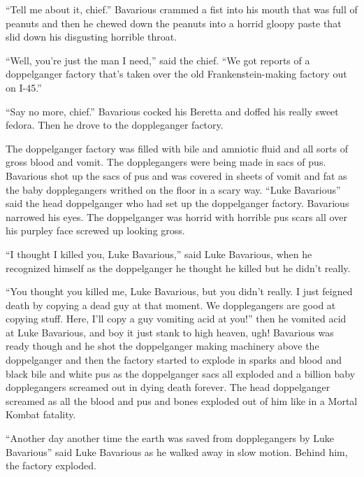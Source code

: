 ``Tell me about it, chief.'' Bavarious crammed a fist
into his mouth that was full of peanuts and then he chewed down the
peanuts into a horrid gloopy paste that slid down his disgusting
horrible throat.

``Well, you're just the man I need,'' said the
chief. ``We got reports of a doppelganger factory that's
taken over the old Frankenstein-making factory out on
I-45.''

``Say no more, chief.'' Bavarious cocked his Beretta and
doffed his really sweet fedora. Then he drove to the doppleganger
factory.



The doppelganger factory was filled with bile and amniotic fluid
and all sorts of gross blood and vomit. The dopplegangers were
being made in sacs of pus. Bavarious shot up the sacs of pus and
was covered in sheets of vomit and fat as the baby dopplegangers
writhed on the floor in a scary way. ``Luke Bavarious''
said the head doppelganger who had set up the doppelganger factory.
Bavarious narrowed his eyes. The doppelganger was horrid with
horrible pus scars all over his purpley face screwed up looking
gross.

``I thought I killed you, Luke Bavarious,'' said Luke
Bavarious, when he recognized himself as the doppelganger he
thought he killed but he didn't really.

``You thought you killed me, Luke Bavarious, but you
didn't really. I just feigned death by copying a dead guy at
that moment. We dopplegangers are good at copying stuff. Here,
I'll copy a guy vomiting acid at you!'' then he vomited
acid at Luke Bavarious, and boy it just stank to high heaven, ugh!
Bavarious was ready though and he shot the doppelganger making
machinery above the doppelganger and then the factory started to
explode in sparks and blood and black bile and white pus as the
doppelganger sacs all exploded and a billion baby dopplegangers
screamed out in dying death forever. The head doppelganger screamed
as all the blood and pus and bones exploded out of him like in a
Mortal Kombat fatality.

``Another day another time the earth was saved from
dopplegangers by Luke Bavarious'' said Luke Bavarious as he
walked away in slow motion. Behind him, the factory exploded.



